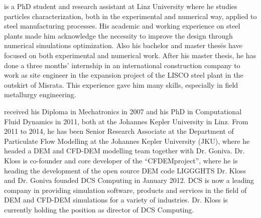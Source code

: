  is a PhD student and research assistant at Linz University where he studies particles characterization, both in the experimental and numerical way, 
applied to steel manufacturing processes. His academic and working experience on steel plants made him acknowledge the necessity to improve the design through numerical simulations 
optimization. Also his bachelor and master thes\={e}s have focused on both experimental and numerical work.
After his master thesis, he has done a three months' internship in an
international construction company to work as site engineer in the expansion project of the LISCO steel plant in 
the outskirt of Misrata. This experience gave him many skills, especially in field metallurgy engineering.

\vspace{2cm}

 received his Diploma in Mechatronics in 2007 and his PhD in Computational Fluid Dynamics in 2011, 
both at the Johannes Kepler University in Linz. From 2011 to 2014, he has been Senior Research Associate at the Department of 
Particulate Flow Modelling at the Johannes Kepler University (JKU), where he headed a DEM and CFD-DEM modelling team together 
with Dr. Goniva. Dr. Kloss is co-founder and core developer of the ``CFDEM\textregistered project'', where he is heading the development of the open source DEM code LIGGGHTS\textregistered
Dr. Kloss and Dr. Goniva founded DCS Computing in January 2012. DCS is now a leading company in providing simulation software, 
products and services in the field of DEM and CFD-DEM simulations for a variety of industries. Dr. Kloss is currently holding the position as director of DCS Computing.

\vspace{2cm}

